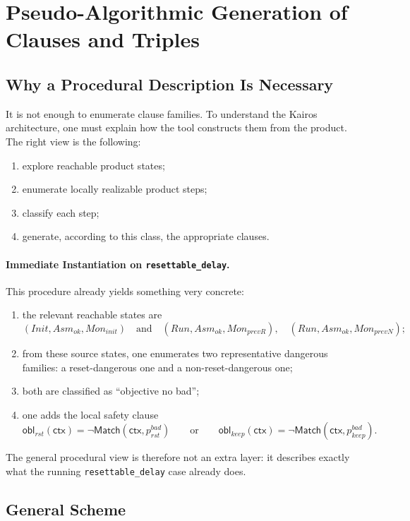 \documentclass[11pt,a4paper]{article}
\newcommand{\Match}{\mathsf{Match}}
\newcommand{\ctx}{\mathsf{ctx}}
\begin{document}
\section{Pseudo-Algorithmic Generation of Clauses and Triples}

\subsection{Why a Procedural Description Is Necessary}

It is not enough to enumerate clause families. To understand the Kairos
architecture, one must explain how the tool constructs them from the product.
The right view is the following:
\begin{enumerate}[leftmargin=1.4em]
\item explore reachable product states;
\item enumerate locally realizable product steps;
\item classify each step;
\item generate, according to this class, the appropriate clauses.
\end{enumerate}

\paragraph{Immediate Instantiation on \texttt{resettable\_delay}.}
This procedure already yields something very concrete:
\begin{enumerate}[leftmargin=1.4em]
\item the relevant reachable states are
  \[
  (Init,Asm_{ok},Mon_{init})
  \quad\text{and}\quad
  (Run,Asm_{ok},Mon_{prevR}),
  \quad
  (Run,Asm_{ok},Mon_{prevN});
  \]
\item from these source states, one enumerates two representative dangerous
  families:
  a reset-dangerous one and a non-reset-dangerous one;
\item both are classified as ``objective no bad'';
\item one adds the local safety clause
  \[
  \mathsf{obl}_{rst}(\ctx) = \neg \Match(\ctx,p_{rst}^{bad})
  \qquad\text{or}\qquad
  \mathsf{obl}_{keep}(\ctx) = \neg \Match(\ctx,p_{keep}^{bad}).
  \]
\end{enumerate}
The general procedural view is therefore not an extra layer: it describes
exactly what the running \texttt{resettable\_delay} case already does.

\subsection{General Scheme}
\end{document}
